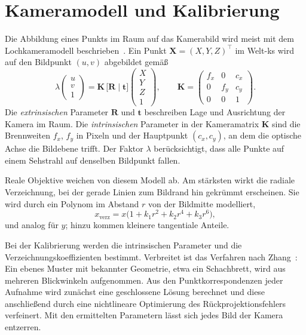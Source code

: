 \section{Kameramodell und Kalibrierung}
\label{sec:kalibrierung}

Die Abbildung eines Punkts im Raum auf das Kamerabild wird meist mit dem Lochkameramodell
beschrieben~\cite{hartley2004}. Ein Punkt $\mathbf{X} = (X, Y, Z)^\top$ im Welt-\ac{ks} wird
auf den Bildpunkt $(u, v)$ abgebildet gemäß
\begin{equation}
  \lambda \begin{pmatrix} u \\ v \\ 1 \end{pmatrix}
  = \mathbf{K}\, \bigl[\mathbf{R} \mid \mathbf{t}\bigr]
    \begin{pmatrix} X \\ Y \\ Z \\ 1 \end{pmatrix},
  \qquad
  \mathbf{K} = \begin{pmatrix} f_x & 0 & c_x \\ 0 & f_y & c_y \\ 0 & 0 & 1 \end{pmatrix} .
  \label{eq:lochkamera}
\end{equation}
Die \emph{extrinsischen} Parameter $\mathbf{R}$ und $\mathbf{t}$ beschreiben Lage und
Ausrichtung der Kamera im Raum. Die \emph{intrinsischen} Parameter in der Kameramatrix
$\mathbf{K}$ sind die Brennweiten $f_x$, $f_y$ in Pixeln und der Hauptpunkt $(c_x, c_y)$, an
dem die optische Achse die Bildebene trifft. Der Faktor $\lambda$ berücksichtigt, dass alle
Punkte auf einem Sehstrahl auf denselben Bildpunkt fallen.

Reale Objektive weichen von diesem Modell ab. Am stärksten wirkt die radiale Verzeichnung,
bei der gerade Linien zum Bildrand hin gekrümmt erscheinen. Sie wird durch ein Polynom im
Abstand $r$ von der Bildmitte modelliert,
\begin{equation}
  x_\text{verz} = x \bigl(1 + k_1 r^2 + k_2 r^4 + k_3 r^6\bigr),
\end{equation}
und analog für $y$; hinzu kommen kleinere tangentiale Anteile.

Bei der Kalibrierung werden die intrinsischen Parameter und die Verzeichnungskoeffizienten
bestimmt. Verbreitet ist das Verfahren nach Zhang~\cite{zhang2000}: Ein ebenes Muster mit
bekannter Geometrie, etwa ein Schachbrett, wird aus mehreren Blickwinkeln aufgenommen. Aus
den Punktkorrespondenzen jeder Aufnahme wird zunächst eine geschlossene Lösung berechnet und
diese anschließend durch eine nichtlineare Optimierung des Rückprojektionsfehlers verfeinert.
Mit den ermittelten Parametern lässt sich jedes Bild der Kamera entzerren.

